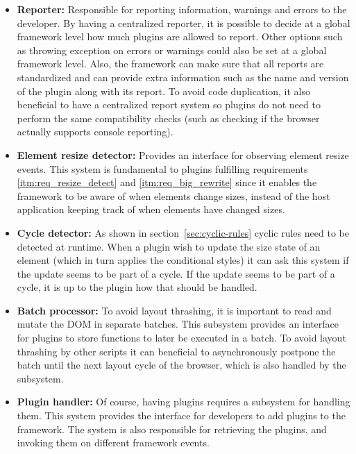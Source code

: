 \documentclass[a4paper,11pt]{kth-mag}
\begin{document}
        \begin{itemize}
          \item \textbf{Reporter:}
            Responsible for reporting information, warnings and errors to the developer.
            By having a centralized reporter, it is possible to decide at a global framework level how much plugins are allowed to report.
            Other options such as throwing exception on errors or warnings could also be set at a global framework level.
            Also, the framework can make sure that all reports are standardized and can provide extra information such as the name and version of the plugin along with its report.
            To avoid code duplication, it also beneficial to have a centralized report system so plugins do not need to perform the same compatibility checks (such as checking if the \gls{browser} actually supports console reporting).
          \item \textbf{Element resize detector:}
            Provides an interface for observing \gls{element} resize events.
            This system is fundamental to plugins fulfilling requirements \ref{itm:req_resize_detect} and \ref{itm:req_big_rewrite} since it enables the framework to be aware of when \glspl{element} change sizes, instead of the host application keeping track of when \glspl{element} have changed sizes.
          \item \textbf{Cycle detector:}
            As shown in section~\ref{sec:cyclic-rules} cyclic rules need to be detected at runtime.
            When a plugin wish to update the size state of an \gls{element} (which in turn applies the conditional styles) it can ask this system if the update seems to be part of a cycle.
            If the update seems to be part of a cycle, it is up to the plugin how that should be handled.
          \item \textbf{Batch processor:}
            To avoid layout thrashing, it is important to read and mutate the \gls{DOM} in separate batches.
            This subsystem provides an interface for plugins to store functions to later be executed in a batch.
            To avoid layout thrashing by other scripts it can beneficial to asynchronously postpone the batch until the next layout cycle of the \gls{browser}, which is also handled by the subsystem.
          \item \textbf{Plugin handler:}
            Of course, having plugins requires a subsystem for handling them.
            This system provides the interface for developers to add plugins to the framework.
            The system is also responsible for retrieving the plugins, and invoking them on different framework events.
        \end{itemize}
\end{document}
